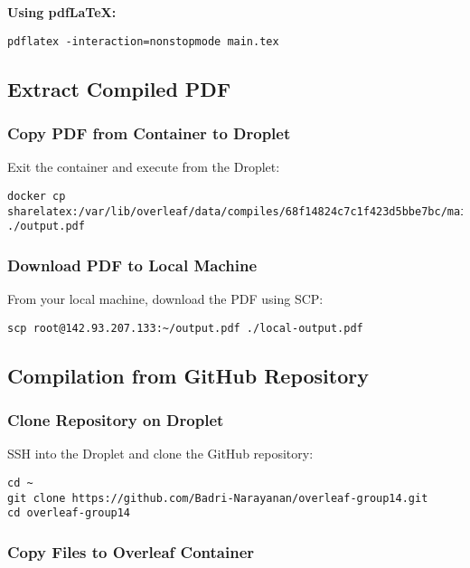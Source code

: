 \textbf{Using pdfLaTeX:}

\begin{verbatim}
pdflatex -interaction=nonstopmode main.tex
\end{verbatim}

\subsection{Extract Compiled PDF}

\subsubsection{Copy PDF from Container to Droplet}

Exit the container and execute from the Droplet:

\begin{verbatim}
docker cp sharelatex:/var/lib/overleaf/data/compiles/68f14824c7c1f423d5bbe7bc/main.pdf ./output.pdf
\end{verbatim}

\subsubsection{Download PDF to Local Machine}

From your local machine, download the PDF using SCP:

\begin{verbatim}
scp root@142.93.207.133:~/output.pdf ./local-output.pdf
\end{verbatim}

\subsection{Compilation from GitHub Repository}

\subsubsection{Clone Repository on Droplet}

SSH into the Droplet and clone the GitHub repository:

\begin{verbatim}
cd ~
git clone https://github.com/Badri-Narayanan/overleaf-group14.git
cd overleaf-group14
\end{verbatim}

\subsubsection{Copy Files to Overleaf Container}

